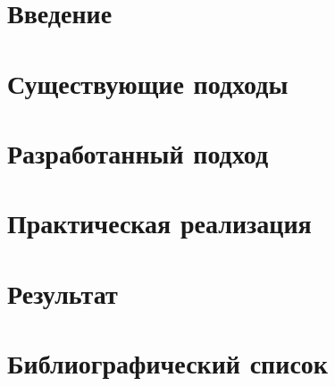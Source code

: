 \documentclass[14pt]{extarticle}
\begin{document}
	\tableofcontents
	\clearpage

	\section{Введение}
	
	\FloatBarrier
	\clearpage

	\section{Существующие подходы}
	
	\FloatBarrier
	\clearpage

	\section{Разработанный подход}
	
	\FloatBarrier
	\clearpage

	\section{Практическая реализация}
	
	\FloatBarrier
	\clearpage

	\section{Результат}
	
	\FloatBarrier
	\clearpage

	\section{Библиографический список}
	
	\clearpage
\end{document}
